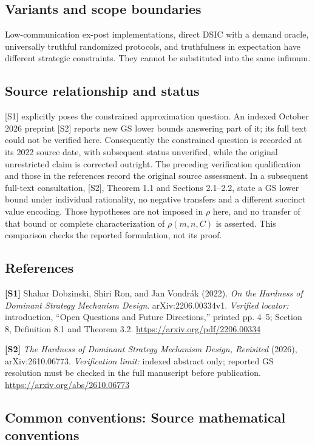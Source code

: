 \documentclass[11pt,a4paper]{article}
\begin{document}
\subsection*{Variants and scope boundaries}
Low-communication ex-post implementations, direct DSIC with a demand oracle, universally truthful randomized protocols, and truthfulness in expectation have different strategic constraints. They cannot be substituted into the same infimum.
\subsection*{Source relationship and status}
[S1] explicitly poses the constrained approximation question. An indexed October 2026 preprint [S2] reports new GS lower bounds answering part of it; its full text could not be verified here. Consequently the constrained question is recorded at its 2022 source date, with subsequent status unverified, while the original unrestricted claim is corrected outright.
The preceding verification qualification and those in the references record the original source assessment. In a subsequent full-text consultation, [S2], Theorem 1.1 and Sections 2.1--2.2, state a GS lower bound under individual rationality, no negative transfers and a different succinct value encoding. Those hypotheses are not imposed in $\rho$ here, and no transfer of that bound or complete characterization of $\rho(m,n,C)$ is asserted. This comparison checks the reported formulation, not its proof.
\subsection*{References}
\begingroup\footnotesize\raggedright
\textbf{[S1]} Shahar Dobzinski, Shiri Ron, and Jan Vondr\'ak (2022). \emph{On the Hardness of Dominant Strategy Mechanism Design}. arXiv:2206.00334v1. \textit{Verified locator:} introduction, ``Open Questions and Future Directions,'' printed pp. 4--5; Section 8, Definition 8.1 and Theorem 3.2. \url{https://arxiv.org/pdf/2206.00334}
\par\textbf{[S2]} \emph{The Hardness of Dominant Strategy Mechanism Design, Revisited} (2026), arXiv:2610.06773. \textit{Verification limit:} indexed abstract only; reported GS resolution must be checked in the full manuscript before publication. \url{https://arxiv.org/abs/2610.06773}
\par\endgroup

\subsection*{Common conventions: Source mathematical conventions}
\end{document}
